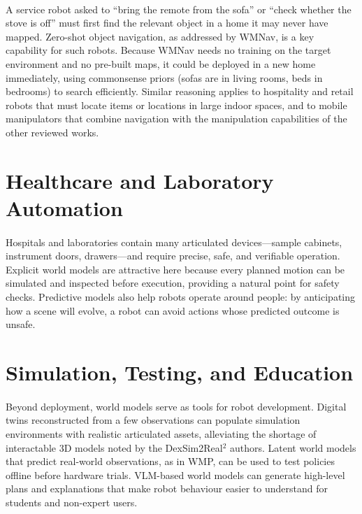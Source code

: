 \documentclass[12pt,a4paper,final]{extreport}
\begin{document}
\paragraph{} A service robot asked to ``bring the remote from the sofa'' or ``check whether the stove is off'' must first find the relevant object in a home it may never have mapped. Zero-shot object navigation, as addressed by WMNav, is a key capability for such robots. Because WMNav needs no training on the target environment and no pre-built maps, it could be deployed in a new home immediately, using commonsense priors (sofas are in living rooms, beds in bedrooms) to search efficiently. Similar reasoning applies to hospitality and retail robots that must locate items or locations in large indoor spaces, and to mobile manipulators that combine navigation with the manipulation capabilities of the other reviewed works.

\section{Healthcare and Laboratory Automation}

\paragraph{} Hospitals and laboratories contain many articulated devices---sample cabinets, instrument doors, drawers---and require precise, safe, and verifiable operation. Explicit world models are attractive here because every planned motion can be simulated and inspected before execution, providing a natural point for safety checks. Predictive models also help robots operate around people: by anticipating how a scene will evolve, a robot can avoid actions whose predicted outcome is unsafe.

\section{Simulation, Testing, and Education}

\paragraph{} Beyond deployment, world models serve as tools for robot development. Digital twins reconstructed from a few observations can populate simulation environments with realistic articulated assets, alleviating the shortage of interactable 3D models noted by the DexSim2Real$^2$ authors. Latent world models that predict real-world observations, as in WMP, can be used to test policies offline before hardware trials. VLM-based world models can generate high-level plans and explanations that make robot behaviour easier to understand for students and non-expert users.
\end{document}

